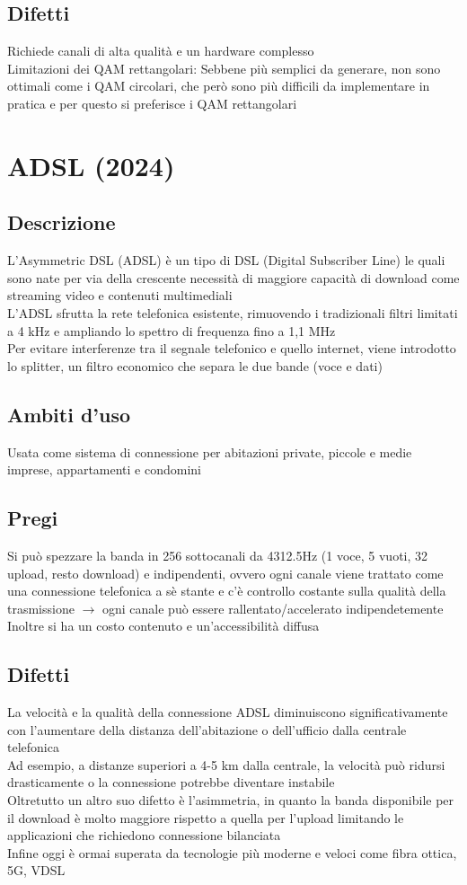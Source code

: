 \documentclass[10pt,oneside,a4paper]{article}
\begin{document}
\subsection{Difetti}
Richiede canali di alta qualità e un hardware complesso\\
Limitazioni dei QAM rettangolari: Sebbene più semplici da generare, non sono ottimali come i QAM circolari, che però sono più difficili da implementare in pratica e per questo si preferisce i QAM rettangolari
\section{ADSL (2024)}
\subsection{Descrizione}
L'Asymmetric DSL (ADSL) è un tipo di DSL (Digital Subscriber Line) le quali sono nate per via della crescente necessità di maggiore capacità di download come streaming video e contenuti multimediali\\
L'ADSL sfrutta la rete telefonica esistente, rimuovendo i tradizionali filtri limitati a 4 kHz e ampliando lo spettro di frequenza fino a 1,1 MHz\\
Per evitare interferenze tra il segnale telefonico e quello internet, viene introdotto lo splitter, un filtro economico che separa le due bande (voce e dati)
\subsection{Ambiti d'uso}
Usata come sistema di connessione per abitazioni private, piccole e medie imprese, appartamenti e condomini
\subsection{Pregi}
Si può spezzare la banda in 256 sottocanali da 4312.5Hz (1 voce, 5 vuoti, 32 upload, resto download) e indipendenti, ovvero ogni canale viene trattato come una connessione telefonica a sè stante e c'è controllo costante sulla qualità della trasmissione $\to$ ogni canale può essere rallentato/accelerato indipendetemente\\
Inoltre si ha un costo contenuto e un'accessibilità diffusa
\subsection{Difetti}
La velocità e la qualità della connessione ADSL diminuiscono significativamente con l'aumentare della distanza dell'abitazione o dell'ufficio dalla centrale telefonica\\
Ad esempio, a distanze superiori a 4-5 km dalla centrale, la velocità può ridursi drasticamente o la connessione potrebbe diventare instabile\\
Oltretutto un altro suo difetto è l'asimmetria, in quanto la banda disponibile per il download è molto maggiore rispetto a quella per l'upload limitando le applicazioni che richiedono connessione bilanciata\\
Infine oggi è ormai superata da tecnologie più moderne e veloci come fibra ottica, 5G, VDSL
\end{document}
